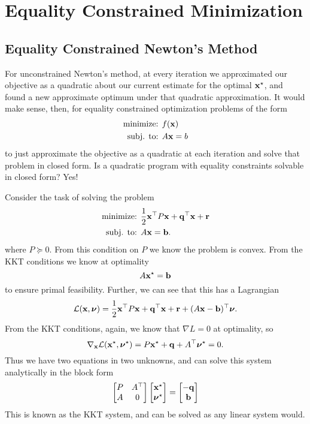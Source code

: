 \documentclass[12pt,letterpaper]{article}
\begin{document}
\section{Equality Constrained Minimization}
\subsection{Equality Constrained Newton's Method}

For unconstrained Newton's method, at every iteration we approximated our objective as a quadratic
about our current estimate for the optimal ${\bf x}^\star$, and found a new approximate optimum under
that quadratic approximation. It would make sense, then, for equality constrained optimization problems
of the form
\begin{align*}
    \text{minimize: } & f({\bf x})\\
    \text{subj. to: } & A{\bf x} = b
\end{align*}
to just approximate the objective as a quadratic at each iteration and solve that problem in closed form.
Is a quadratic program with equality constraints solvable in closed form? Yes!

\begin{example}
    Consider the task of solving the problem
    \begin{align*}
        \text{minimize: } & \frac{1}{2}{\bf x}^\top P{\bf x} + {\bf q}^\top{\bf x} + {\bf r}\\
        \text{subj. to: } & A{\bf x} = {\bf b}.
    \end{align*}
    where $P \succeq 0$. From this condition on $P$ we know the problem is convex.
    From the KKT conditions we know at optimality
    \[
        A{\bf x}^\star = {\bf b}
    \]
    to ensure primal feasibility.
    Further, we can see that this has a Lagrangian
    \[
        {\cal L}({\bf x}, \hbox{\boldmath$\nu$}) = \frac{1}{2}{\bf x}^\top P{\bf x} + {\bf q}^\top{\bf x} + {\bf r} + (A{\bf x} - {\bf b})^\top\hbox{\boldmath$\nu$}.
    \]
    From the KKT conditions, again, we know that $\nabla L = 0$
    at optimality, so
    \[
        \nabla_{{\bf x}} {\cal L}({\bf x}^\star, \hbox{\boldmath$\nu$}^\star) = P{\bf x}^\star + {\bf q} + A^\top\hbox{\boldmath$\nu$}^\star = 0.
    \]
    Thus we have two equations in two unknowns, and can solve this
    system analytically in the block form
    \[
        \begin{bmatrix} P & A^\top \\ A & 0 \end{bmatrix} \begin{bmatrix} {\bf x}^\star \\ \hbox{\boldmath$\nu$}^\star \end{bmatrix} = \begin{bmatrix} -{\bf q} \\ {\bf b} \end{bmatrix}
    \]
    This is known as the KKT system, and can be solved as any linear system would.
\end{example}
\end{document}
